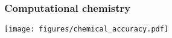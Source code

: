 

\begin{frame}
\frametitle{Computational chemistry}
\centering
\texttt{[image: figures/chemical\_accuracy.pdf]}
\end{frame}


